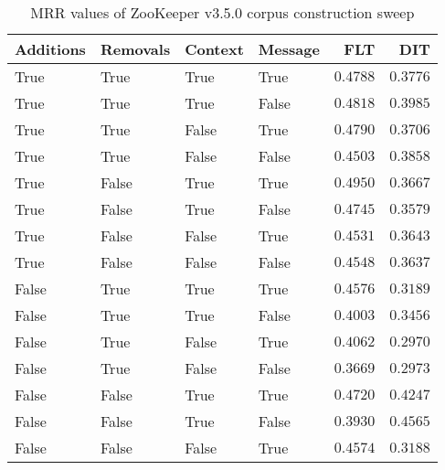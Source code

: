 
\begin{table}
\begin{spacing}{1.2}
\centering
\caption{MRR values of ZooKeeper v3.5.0 corpus construction sweep}
\label{table:zookeeper_corpus_sweep}
\vspace{0.2em}
\begin{tabular}{llll|rr}
\toprule
Additions & Removals & Context & Message & FLT &        DIT \\
\midrule
     True &     True &    True &    True &         $0.4788$ &      $0.3776$ \\
     \myrowcolor True &     True &    True &   False &         $0.4818$ &      $0.3985$ \\
     True &     True &   False &    True &         $0.4790$ &      $0.3706$ \\
     True &     True &   False &   False &         $0.4503$ &      $0.3858$ \\
     True &    False &    True &    True &    $\bm{0.4950}$ &      $0.3667$ \\
     True &    False &    True &   False &         $0.4745$ &      $0.3579$ \\
     True &    False &   False &    True &         $0.4531$ &      $0.3643$ \\
     True &    False &   False &   False &         $0.4548$ &      $0.3637$ \\
    False &     True &    True &    True &         $0.4576$ &      $0.3189$ \\
    False &     True &    True &   False &         $0.4003$ &      $0.3456$ \\
    False &     True &   False &    True &         $0.4062$ &      $0.2970$ \\
    False &     True &   False &   False &         $0.3669$ &      $0.2973$ \\
    False &    False &    True &    True &         $0.4720$ &      $0.4247$ \\
    False &    False &    True &   False &         $0.3930$ & $\bm{0.4565}$ \\
    False &    False &   False &    True &         $0.4574$ &      $0.3188$ \\
\bottomrule
\end{tabular}

\end{spacing}
\end{table}
